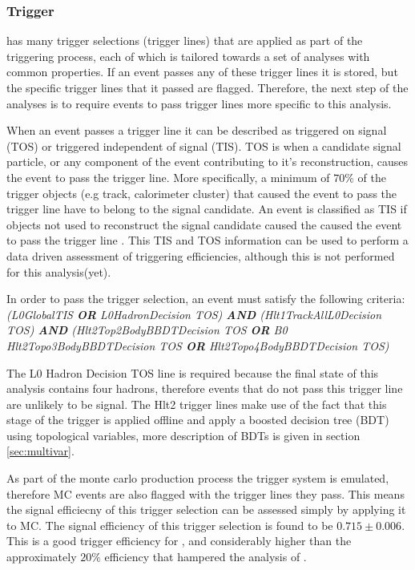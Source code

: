 \subsubsection{Trigger}
\label{sec:trigger}
\lhcb has many trigger selections (trigger lines) that are applied as part of the triggering process, each of which is tailored towards a set of analyses with common properties. If an event passes any of these trigger lines it is stored, but the specific trigger lines that it passed are flagged.  Therefore, the next step of the analyses is to require events to pass trigger lines more specific to this analysis.

When an event passes a trigger line it can be described as triggered on signal (TOS) or triggered independent of signal (TIS).  TOS is when a candidate signal particle, or any component of the event contributing to it's reconstruction, causes the event to pass the trigger line.  More specifically, a minimum of $70\%$ of the trigger objects (e.g track, calorimeter cluster) that caused the event to pass the trigger line have to belong to the signal candidate. An event is classified as TIS if objects not used to reconstruct the signal candidate caused the caused the event to pass the trigger line \cite{1748-0221-8-04-P04022}. This TIS and TOS information can be used to perform a data driven assessment of triggering efficiencies, although this is not performed for this analysis(yet)\cite{Tolk:1701134}.

In order to pass the trigger selection, an event must satisfy the following criteria:
\textit{
  (L0GlobalTIS \textbf{OR} L0HadronDecision TOS) \textbf{AND} (Hlt1TrackAllL0Decision TOS) \textbf{AND} (Hlt2Top2BodyBBDTDecision TOS \textbf{OR} B0 Hlt2Topo3BodyBBDTDecision TOS \textbf{OR} Hlt2Topo4BodyBBDTDecision TOS)
}

The L0 Hadron Decision TOS line is required because the final state of this analysis contains four hadrons, therefore events that do not pass this trigger line are unlikely to be signal.  The Hlt2 trigger lines make use of the fact that this stage of the trigger is applied offline and apply a boosted decision tree (BDT) using topological variables, more description of BDTs is given in section \ref{sec:multivar}.

As part of the monte carlo production process the \lhcb trigger system is emulated, therefore MC events are also flagged with the trigger lines they pass.  This means the signal efficiecny of this trigger selection can be assessed simply by applying it to MC.  The signal efficiency of this trigger selection is found to be $0.715\pm0.006$.  This is a good trigger efficiency for \lhcb, and considerably higher than the approximately $20\%$ efficiency that hampered the analysis of \Lb \to \Lz\etaz \cite{LHCb-PAPER-2015-019}.

